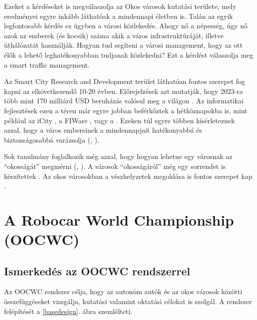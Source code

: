 \documentclass[a4paper,12pt]{report}
\begin{document}
\vspace{2mm}
Ezeket a kérdéseket is megválaszolja az Okos városok kutatási területe, mely eredményei egyre inkább láthatóak a mindennapi életben is. Talán az egyik legfontosabb kérdés ez ügyben a városi közlekedés. Ahogy nő a népesség, úgy nő azok az emberek (és kocsik) száma akik a város infrastruktúráját, illetve úthálózatát használják. Hogyan tud segíteni a városi management, hogy az ott élők a lehető leghatékonyabban tudjanak közlekedni? Ezt a kérdést válaszolja meg a smart traffic management.

\vspace{2mm}
Az Smart City Research and Development terület láthatóan fontos szerepet fog kapni az elkövetkezendő 10-20 évben. Előrejelzések azt mutatják, hogy 2023-ra több mint 170 milliárd USD beruházás valósul meg a világon \cite{navigant}. Az informatikai fejlesztések ezen a téren már egyre jobban beférkőztek a hétköznapokba is, mint például az iCity \cite{icity}, a FI\-Ware \cite{fiware}, vagy a \cite{vital}. Ezeken túl egyre többen kísérleteznek azzal, hogy a város embereinek a mindennapjait hatékonyabbá és biztonságosabbá varázsolja (\cite{myneighbourhood}, \cite{smartsantander}).

\vspace{2mm}
Sok tanulmány foglalkozik még azzal, hogy hogyan lehetne egy városnak az ``okosságát'' megmérni (\cite{de2014smart}, \cite{carli2013measuring}). A városok ``okosságáról'' még egy sorrendet is készítettek \cite{giffinger2007smart}. Az okos városokban a vészhelyzetek megoldása is fontos szerepet kap \cite{du2012research}.

\chapter{A Robocar World Championship (OOCWC)}
\label{oocwc}

\section{Ismerkedés az OOCWC rendszerrel}

Az OOCWC rendszer célja, hogy az autonóm autók és az okos városok közötti összefüggéseket vizsgálja, kutatási valamint oktatási célokat is szolgál. A rendszer felépítését a \ref{basedesign}. ábra szemlélteti.
\end{document}
